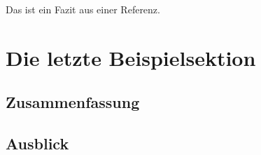 \lipsum[12]

Das ist ein Fazit aus einer Referenz. \cite{000:Reference}

\lipsum[13]

\section{Die letzte Beispielsektion}
\label{sec:01-01_example}

\subsection{Zusammenfassung}
\label{subsec:01-01-00_subsection}

\lipsum[14]

\subsection{Ausblick}
\label{subsec:01-01-01_conclusion}

\lipsum[15]
